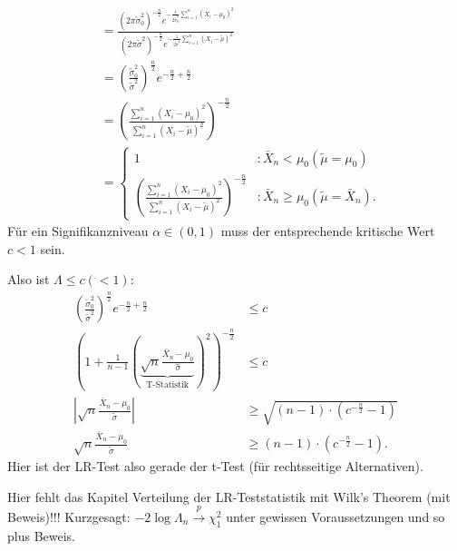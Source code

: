 \documentclass[10pt]{article}
\newcommand{\KW}{\overset{p} \longrightarrow} %
\newcommand{\sni}{\sum_{i=1}^{n}} %
\newenvironment{BSP}[1][]
{\begin{Beispiel}[frametitle=#1]}{\end{Beispiel}}
\begin{document}
\begin{BSP}[Beispiel 2.1.4 (t-Test mit einseitiger Alternative)]
\begin{equation*}
\begin{split}
			&= \frac{(2 \pi \tilde{\sigma}^2_0)^{-\frac{n}{2}} e^{-\frac{1}{2 \tilde{\sigma}^2_0} \sni (X_i - \mu_0)^2}}{(2 \pi \tilde{\sigma}^2)^{-\frac{n}{2}} e^{-\frac{1}{2 \tilde{\sigma}^2} \sni (X_i - \tilde{\mu})^2}}\\
			&= \left(\frac{\tilde{\sigma}^2_0}{\tilde{\sigma}^2}\right)^{\frac{n}{2}} e^{-\frac{n}{2}+\frac{n}{2}}\\
			&=\left(\frac{\sni (X_i - \mu_0)^2}{\sni (X_i - \tilde{\mu})^2}\right)^{-\frac{n}{2}}\\
			&= \begin{cases}
				1 &: \bar{X}_n < \mu_0 (\tilde{\mu} = \mu_0)\\
				\left(\frac{\sni (X_i - \mu_0)^2}{\sni (X_i - \tilde{\mu})^2}\right)^{-\frac{n}{2}} &: \bar{X}_n \geq \mu_0 (\tilde{\mu} = \bar{X}_n).
			\end{cases}
		\end{split}
	\end{equation*}
	Für ein Signifikanzniveau $\alpha \in (0,1)$ muss der entsprechende kritische Wert $c < 1$ sein. 
	
	Also ist $\Lambda \leq c (< 1)$:
	\begin{equation*}
		\begin{split}
			\left(\frac{\tilde{\sigma}^2_0}{\tilde{\sigma}^2}\right)^{\frac{n}{2}} e^{-\frac{n}{2}+\frac{n}{2}} &\leq c\\
			\left(1 + \frac{1}{n-1} \left( \underbrace{ \sqrt{n} \frac{\bar{X}_n - \mu_0}{\hat{\sigma}}}_{\text{T-Statistik}}\right)^2\right)^{-\frac{n}{2}} & \leq c\\
			\left\vert \sqrt{n} \frac{\bar{X}_n - \mu_0}{\tilde{\sigma}} \right\vert & \geq \sqrt{(n-1)\cdot(c^{-\frac{n}{2}} -1)}\\
			\sqrt{n} \frac{\bar{X}_n - \mu_0}{\tilde{\sigma}} & \geq (n-1)\cdot(c^{-\frac{n}{2}} -1).
		\end{split}
	\end{equation*}
	Hier ist der LR-Test also gerade der t-Test (für rechtsseitige Alternativen).
	\end{BSP}

\vspace{3cm}
    
    Hier fehlt das Kapitel Verteilung der LR-Teststatistik mit Wilk's Theorem (mit Beweis)!!!
    Kurzgesagt: $-2\log{\Lambda_n} \KW \chi^2_1$ unter gewissen Voraussetzungen und so plus Beweis.
    
\vspace{3cm}
    
\end{document}
